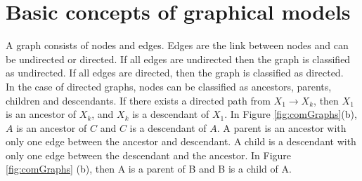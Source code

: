 \documentclass[12pt,oneside,openany,a4paper, %
afrikaans,english,
]{memoir}
\numberwithin{equation}{chapter}
\begin{document}
\section{Basic concepts of graphical models}
A graph consists of nodes and edges. Edges are the link between nodes and can be undirected or directed. If all edges are undirected then the graph is classified as undirected. If all edges are directed, then the graph is classified as directed.\\
In the case of directed graphs, nodes can be classified as ancestors, parents, children and descendants. If there exists a directed path from $X_1 \to X_k$, then $X_1$ is an ancestor of $X_k$, and $X_k$ is a descendant of $X_1$. In Figure \ref{fig:comGraphs}(b), $A$ is an ancestor of $C$ and $C$ is a descendant of $A$. A parent is an ancestor with only one edge between the ancestor and descendant. A child is a descendant with only one edge between the descendant and the ancestor. In Figure \ref{fig:comGraphs} (b), then A is a parent of B and B is a child of A.~\cite{barber}
\end{document}
